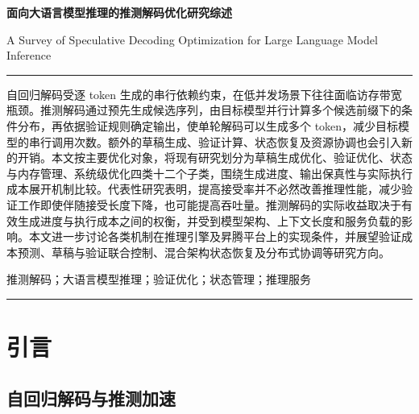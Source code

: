 \documentclass[11pt,a4paper,UTF8,fontset=none,scheme=plain,zihao=-4]{ctexart}
\begin{document}
\begin{center}
  {\bfseries\sffamily 面向大语言模型推理的推测解码优化研究综述\par}
  \vspace{8pt}
  {A Survey of Speculative Decoding Optimization for Large
Language Model Inference\par}
\end{center}

\vspace{4pt}

\noindent\rule{\linewidth}{0.6pt}
\vspace{6pt}

\begingroup
{}
\setlength{\parindent}{2em}
自回归解码受逐 token
生成的串行依赖约束，在低并发场景下往往面临访存带宽瓶颈。推测解码通过预先生成候选序列，由目标模型并行计算多个候选前缀下的条件分布，再依据验证规则确定输出，使单轮解码可以生成多个
token，减少目标模型的串行调用次数。额外的草稿生成、验证计算、状态恢复及资源协调也会引入新的开销。本文按主要优化对象，将现有研究划分为草稿生成优化、验证优化、状态与内存管理、系统级优化四类十二个子类，围绕生成进度、输出保真性与实际执行成本展开机制比较。代表性研究表明，提高接受率并不必然改善推理性能，减少验证工作即使伴随接受长度下降，也可能提高吞吐量。推测解码的实际收益取决于有效生成进度与执行成本之间的权衡，并受到模型架构、上下文长度和服务负载的影响。本文进一步讨论各类机制在推理引擎及昇腾平台上的实现条件，并展望验证成本预测、草稿与验证联合控制、混合架构状态恢复及分布式协调等研究方向。

\vspace{6pt}
推测解码；大语言模型推理；验证优化；状态管理；推理服务
\endgroup

\vspace{4pt}
\noindent\rule{\linewidth}{0.6pt}

\vspace{4pt}
{\tableofcontents}

\clearpage

\hypertarget{section-1}{%
\section{引言}\label{section-1}}

\hypertarget{section-1-1}{%
\subsection{自回归解码与推测加速}\label{section-1-1}}
\end{document}
